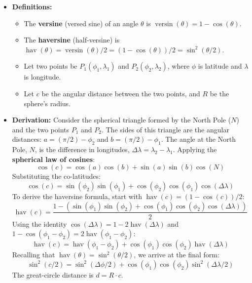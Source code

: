 \documentclass[11pt]{article}
\DeclareMathOperator{\hav}{hav}
\DeclareMathOperator{\versin}{versin}
\begin{document}
\begin{itemize}
    \item \textbf{Definitions:}
    \begin{itemize}
        \item The \textbf{versine} (versed sine) of an angle $\theta$ is $\versin(\theta) = 1 - \cos(\theta)$.
        \item The \textbf{haversine} (half-versine) is $\hav(\theta) = \versin(\theta) / 2 = (1 - \cos(\theta)) / 2 = \sin^2(\theta/2)$.
        \item Let two points be $P_1(\phi_1, \lambda_1)$ and $P_2(\phi_2, \lambda_2)$, where $\phi$ is latitude and $\lambda$ is longitude.
        \item Let $c$ be the angular distance between the two points, and $R$ be the sphere's radius.
    \end{itemize}
    \item \textbf{Derivation:}
    Consider the spherical triangle formed by the North Pole ($N$) and the two points $P_1$ and $P_2$. The sides of this triangle are the angular distances: $a = (\pi/2) - \phi_2$ and $b = (\pi/2) - \phi_1$. The angle at the North Pole, $N$, is the difference in longitudes, $\Delta\lambda = \lambda_2 - \lambda_1$. Applying the \textbf{spherical law of cosines}:
    \[
    \cos(c) = \cos(a)\cos(b) + \sin(a)\sin(b)\cos(N)
    \]
    Substituting the co-latitudes:
    \[
    \cos(c) = \sin(\phi_2)\sin(\phi_1) + \cos(\phi_2)\cos(\phi_1)\cos(\Delta\lambda)
    \]
    To derive the haversine formula, start with $\hav(c) = (1 - \cos(c)) / 2$:
    \[
    \hav(c) = \frac{1 - (\sin(\phi_1)\sin(\phi_2) + \cos(\phi_1)\cos(\phi_2)\cos(\Delta\lambda))}{2}
    \]
    Using the identity $\cos(\Delta\lambda) = 1 - 2\hav(\Delta\lambda)$ and $1 - \cos(\phi_1 - \phi_2) = 2\hav(\phi_1 - \phi_2)$:
    \[
    \hav(c) = \hav(\phi_1 - \phi_2) + \cos(\phi_1)\cos(\phi_2)\hav(\Delta\lambda)
    \]
    Recalling that $\hav(\theta) = \sin^2(\theta/2)$, we arrive at the final form:
    \[
    \sin^2(c/2) = \sin^2(\Delta\phi/2) + \cos(\phi_1)\cos(\phi_2)\sin^2(\Delta\lambda/2)
    \]
    The great-circle distance is $d = R \cdot c$.
\end{itemize}
\end{document}
